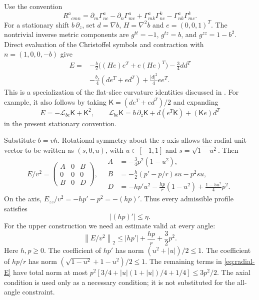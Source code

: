 \documentclass[11pt,a4paper]{article}
\newcommand{\opnorm}[1]{\left\lVert #1\right\rVert_2}
\numberwithin{equation}{section}
\begin{document}
Use the convention
\[
 R^a{}_{cmn}=\partial_m\Gamma^a_{nc}-\partial_n\Gamma^a_{mc}
       +\Gamma^a_{mk}\Gamma^k_{nc}-\Gamma^a_{nk}\Gamma^k_{mc}.
\]
For a stationary shift \(b\,\partial_z\), set \(d=\nabla b\),
\(H=\nabla^2b\) and \(e=(0,0,1)^T\). The nontrivial inverse metric
components are \(g^{tt}=-1\), \(g^{tz}=b\), and \(g^{zz}=1-b^2\).
Direct evaluation of the Christoffel symbols and contraction with
\(n=(1,0,0,-b)\) give
\begin{equation}\label{eq:Egeneral}
 \begin{split}
 E={}&-\frac b2\bigl((He)e^T+e(He)^T\bigr)
       -\frac34dd^T\\
    &-\frac{b_z}{4}(de^T+ed^T)
       +\frac{|d|^2}{4}ee^T.
 \end{split}
\end{equation}
This is a specialization of the flat-slice curvature identities discussed
in \cite[arXiv v2, Sec.~3.1]{santiago}. For example, it also follows by taking
\(\mathsf K=(de^T+ed^T)/2\) and expanding
\[
 E=-\mathcal L_{be}\mathsf K+\mathsf K^2,\qquad
 \mathcal L_{be}\mathsf K=b\,\partial_z\mathsf K+
                  d(e^T\mathsf K)+(\mathsf K e)d^T
\]
in the present stationary convention.

Substitute \(b=vh\). Rotational symmetry about the \(z\)-axis allows the
radial unit vector to be written as \((s,0,u)\), with
\(u\in[-1,1]\) and \(s=\sqrt{1-u^2}\). Then
\begin{equation}\label{eq:radial-E}
 E/v^2=\begin{pmatrix}A&0&B\\0&0&0\\B&0&D\end{pmatrix},
 \quad
 \begin{aligned}
 A&=-\tfrac34p^2(1-u^2),\\
 B&=-\tfrac h2(p'-p/r)su-p^2su,\\
 D&=-hp'u^2-\tfrac{hp}{r}(1-u^2)
                         +\tfrac{1-5u^2}{4}p^2 .
 \end{aligned}
\end{equation}
On the axis, \(E_{zz}/v^2=-hp'-p^2=-(hp)'\). Thus every admissible
profile satisfies
\begin{equation}\label{eq:necessary}
 |(hp)'|\le\eta .
\end{equation}
For the upper construction we need an estimate valid at every angle:
\begin{equation}\label{eq:sufficient}
 \opnorm{E/v^2}\le |hp'|+\frac{hp}{r}+\frac32p^2.
\end{equation}
Here \(h,p\ge0\). The coefficient of \(hp'\) has norm
\((u^2+|u|)/2\le1\). The coefficient of \(hp/r\) has norm
\((\sqrt{1-u^2}+1-u^2)/2\le1\). The remaining terms in
\eqref{eq:radial-E} have total norm at most
\(p^2[3/4+|u|(1+|u|)/4+1/4]\le3p^2/2\).
The axial condition is used only as a necessary condition; it is not
substituted for the all-angle constraint.
\end{document}
